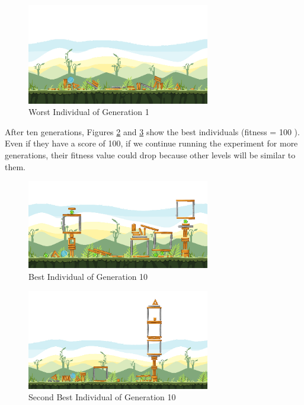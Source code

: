 \documentclass[conference]{IEEEtran}
\begin{document}
\begin{figure}[htbp]
    \centerline{\includegraphics[width=80mm]{Images/Gen1Worst_After.png}}
      \caption{Worst Individual of Generation 1}
          \label{gen1worst}
\end{figure}
After ten generations, Figures  \ref{gen10best} and  \ref{gen10second} show the
best individuals (fitness = 100 ). Even if they have a score of 100, if we
continue running the experiment for more generations, their fitness value could
drop because other levels will be similar to them.  

\begin{figure}[htbp]
    \centerline{\includegraphics[width=80mm]{Images/Last_Gen_1st_Best_After.png}}
      \caption{Best Individual of Generation 10}
          \label{gen10best}
\end{figure}

\begin{figure}[htbp]
    \centerline{\includegraphics[width=80mm]{Images/Last_Gen_2nd_Best_After.png}}
      \caption{Second Best Individual of Generation 10}
          \label{gen10second}
\end{figure}


    
\end{document}
